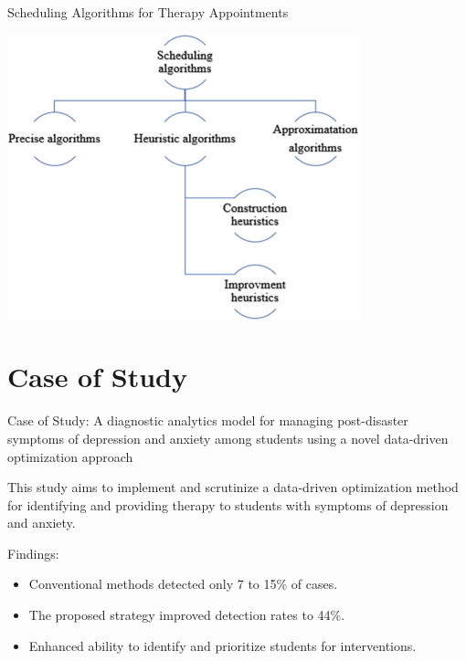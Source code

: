\documentclass[10pt, xcolor=table]{beamer}
\let\olditem\item
\renewcommand\item{\olditem\justifying}
\begin{document}
\begin{frame}{Scheduling Algorithms for Therapy Appointments}
	
	\centering
	\includegraphics[width=0.65\linewidth]{./figures/scheduling_types.jpg} %
	
\end{frame}


\section*{Case of Study}

\begin{frame}{Case of Study: A diagnostic analytics model for managing post-disaster symptoms of depression and anxiety among students using a novel data-driven optimization approach}
	
This study aims to implement and scrutinize a data-driven optimization method for identifying and providing therapy to students with symptoms of depression and anxiety.
\vspace{0.5cm}
	
	Findings:
\begin{itemize}
	\item Conventional methods detected only 7 to 15\% of cases.
	\item The proposed strategy improved detection rates to 44\%.
	\item Enhanced ability to identify and prioritize students for interventions.
\end{itemize}
	
\end{frame}
\end{document}
